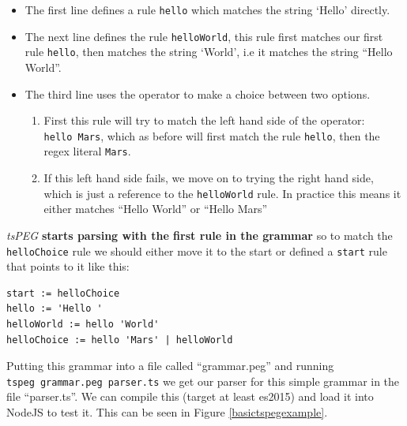\begin{itemize}

\item
  The first line defines a rule \texttt{hello} which matches the string
  `Hello' directly.
\item
  The next line defines the rule \texttt{helloWorld}, this rule first
  matches our first rule \texttt{hello}, then matches the string
  `World', i.e it matches the string ``Hello World''.
\item
  The third line uses the \texttt{\textbar{}} operator to make a choice
  between two options.

  \begin{enumerate}
  \def\labelenumi{\arabic{enumi}.}
  
  \item
    First this rule will try to match the left hand side of the
    operator: \texttt{hello\ \textquotesingle{}Mars\textquotesingle{}},
    which as before will first match the rule \texttt{hello}, then the
    regex literal \texttt{Mars}.
  \item
    If this left hand side fails, we move on to trying the right hand
    side, which is just a reference to the \texttt{helloWorld} rule. In
    practice this means it either matches ``Hello World'' or ``Hello
    Mars''
  \end{enumerate}
\end{itemize}

\emph{tsPEG} \textbf{starts parsing with the first rule in the grammar}
so to match the \texttt{helloChoice} rule we should either move it to
the start or defined a \texttt{start} rule that points to it like this:

\begin{verbatim}
start := helloChoice
hello := 'Hello '
helloWorld := hello 'World'
helloChoice := hello 'Mars' | helloWorld
\end{verbatim}

Putting this grammar into a file called ``grammar.peg'' and running
\texttt{tspeg\ grammar.peg\ parser.ts} we get our parser for this simple
grammar in the file ``parser.ts''. We can compile this (target at least
es2015) and load it into NodeJS to test it. This can be seen in Figure \ref{basictspegexample}.


